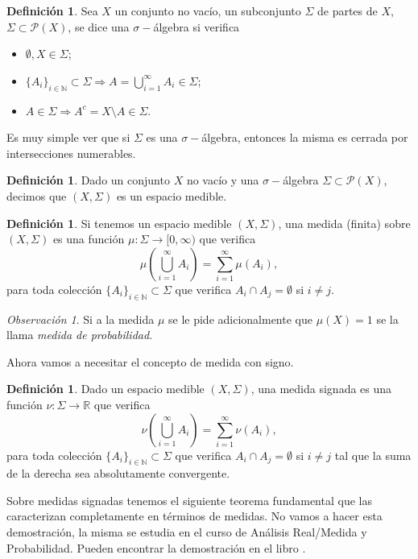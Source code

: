 \documentclass[12pt, a4paper]{amsbook}
\newcommand{\R}{{\mathbb R}}
\newcommand{\N}{{\mathbb N}}
\theoremstyle{remark}
\newtheorem{obs}[teo]{Observaci\'on}
\theoremstyle{definition}
\newtheorem{defi}[teo]{Definici\'on}
\numberwithin{section}{chapter}
\numberwithin{subsection}{section}
\numberwithin{equation}{section}
\numberwithin{figure}{chapter}
\begin{document}
\begin{defi}
Sea $X$ un conjunto no vacío, un subconjunto $\Sigma$ de partes de $X$, $\Sigma\subset \mathcal P(X)$, se dice una $\sigma-$álgebra si verifica
\begin{itemize}
\item[(i)] $\emptyset, X\in \Sigma$;

\item[(ii)] $\{A_i\}_{i\in\N}\subset \Sigma \Longrightarrow A=\bigcup_{i=1}^\infty A_i \in \Sigma$;

\item[(iii)] $A\in \Sigma \Longrightarrow A^c = X\setminus A\in \Sigma$.
\end{itemize}
\end{defi}

Es muy simple ver que si $\Sigma$ es una $\sigma-$álgebra, entonces la misma es cerrada por intersecciones numerables.

\begin{defi}
Dado un conjunto $X$ no vacío y una $\sigma-$álgebra $\Sigma\subset \mathcal P(X)$, decimos que $(X, \Sigma)$ es un espacio medible.
\end{defi}

\begin{defi}
Si tenemos un espacio medible $(X,\Sigma)$, una medida (finita) sobre $(X, \Sigma)$ es una función $\mu\colon \Sigma\to [0,\infty)$ que verifica
$$
\mu\left(\bigcup_{i=1}^\infty A_i\right) = \sum_{i=1}^\infty \mu(A_i),
$$
para toda colección $\{A_i\}_{i\in\N}\subset \Sigma$ que verifica $A_i\cap A_j=\emptyset$ si $i\neq j$.
\end{defi}

\begin{obs}
Si a la medida $\mu$ se le pide adicionalmente que $\mu(X)=1$ se la llama {\em medida de probabilidad}.
\end{obs}

Ahora vamos a necesitar el concepto de medida con signo.

\begin{defi}
Dado un espacio medible $(X, \Sigma)$, una medida signada es una función $\nu\colon \Sigma\to\R$ que verifica
$$
\nu\left(\bigcup_{i=1}^\infty A_i\right) = \sum_{i=1}^\infty \nu(A_i),
$$
para toda colección $\{A_i\}_{i\in\N}\subset \Sigma$ que verifica $A_i\cap A_j=\emptyset$ si $i\neq j$ tal que la suma de la derecha sea absolutamente convergente.
\end{defi}

Sobre medidas signadas tenemos el siguiente teorema fundamental que las caracterizan completamente en términos de medidas. No vamos a hacer esta demostración, la misma se estudia en el curso de Análisis Real/Medida y Probabilidad. Pueden encontrar la demostración en el libro \cite{Wheeden-Zygmund}.
\end{document}

